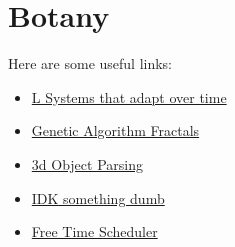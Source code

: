 \chapter{Botany}

Here are some useful links:

\begin{itemize}
    \item \href{https://github.com/zoso95/lsystems}{L Systems that adapt over time}
    \item \href{https://github.com/zoso95/genetic-algorithm-fractals}{Genetic Algorithm Fractals}
    \item \href{https://github.com/zoso95/3d-object-parsing}{3d Object Parsing}
    \item \href{https://github.com/zoso95/idk-something-dumb}{IDK something dumb}
    \item \href{https://github.com/zoso95/freetimescheduler}{Free Time Scheduler}
\end{itemize}
